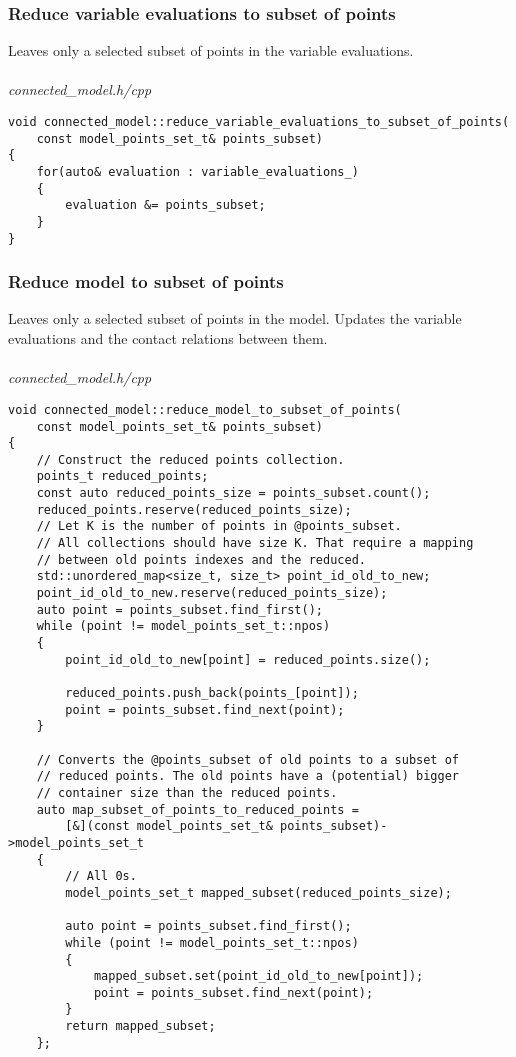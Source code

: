 \documentclass{article}
\begin{document}
	\subsubsection*{Reduce variable evaluations to subset of points}
	Leaves only a selected subset of points in the variable evaluations.
\\
\\
\noindent
\textit{connected\_model.h/cpp}
\begin{lstlisting}
void connected_model::reduce_variable_evaluations_to_subset_of_points(
	const model_points_set_t& points_subset)
{
    for(auto& evaluation : variable_evaluations_)
    {
        evaluation &= points_subset;
    }
}
\end{lstlisting}

	\newpage
	\subsubsection*{Reduce model to subset of points}
	Leaves only a selected subset of points in the model. Updates the variable evaluations and the contact relations between them.
\\
\\
\noindent
\textit{connected\_model.h/cpp}
\begin{lstlisting}
void connected_model::reduce_model_to_subset_of_points(
	const model_points_set_t& points_subset)
{
    // Construct the reduced points collection.
    points_t reduced_points;
    const auto reduced_points_size = points_subset.count();
    reduced_points.reserve(reduced_points_size);
    // Let K is the number of points in @points_subset.
    // All collections should have size K. That require a mapping
    // between old points indexes and the reduced.
    std::unordered_map<size_t, size_t> point_id_old_to_new;
    point_id_old_to_new.reserve(reduced_points_size);
    auto point = points_subset.find_first();
    while (point != model_points_set_t::npos)
    {
        point_id_old_to_new[point] = reduced_points.size();

        reduced_points.push_back(points_[point]);
        point = points_subset.find_next(point);
    }

    // Converts the @points_subset of old points to a subset of
    // reduced points. The old points have a (potential) bigger
    // container size than the reduced points.
    auto map_subset_of_points_to_reduced_points =
        [&](const model_points_set_t& points_subset)->model_points_set_t
    {
        // All 0s.
        model_points_set_t mapped_subset(reduced_points_size);

        auto point = points_subset.find_first();
        while (point != model_points_set_t::npos)
        {
            mapped_subset.set(point_id_old_to_new[point]);
            point = points_subset.find_next(point);
        }
        return mapped_subset;
    };
\end{lstlisting}
\end{document}
